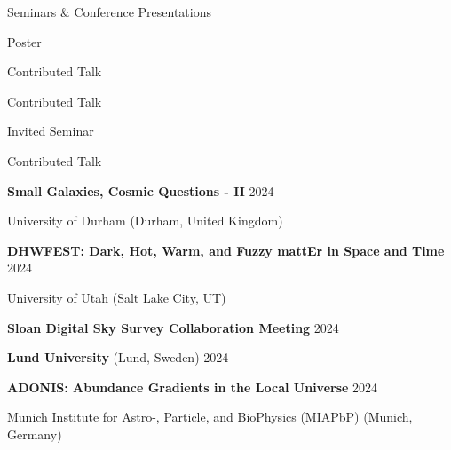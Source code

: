 \documentclass[cv.tex]{subfiles}
\begin{document}
\vspace{5mm}
\noindent
{\color{themecolor} \large Seminars \& Conference Presentations}
\vspace{1mm}
\par\noindent
\parbox{0.18\textwidth}{%
	\raggedleft
	Poster \par
	\null \par
	Contributed Talk \par
	\null \par
	Contributed Talk \par
	Invited Seminar \par
	Contributed Talk \par
	\null \par
}
\hspace{1mm}
\parbox{0.8\textwidth}{%
	\vspace{1mm}
	\textbf{Small Galaxies, Cosmic Questions - II} \hfill 2024 \par
	University of Durham (Durham, United Kingdom) \par
	\textbf{DHWFEST: Dark, Hot, Warm, and Fuzzy mattEr in Space and Time}
	\hfill 2024 \par
	University of Utah (Salt Lake City, UT) \par
	\textbf{Sloan Digital Sky Survey Collaboration Meeting} \hfill 2024 \par
	\textbf{Lund University} (Lund, Sweden) \hfill 2024 \par
	\textbf{ADONIS: Abundance Gradients in the Local Universe}
	\hfill 2024 \par
	Munich Institute for Astro-, Particle, and BioPhysics (MIAPbP)
	(Munich, Germany) \par
}
\end{document}
